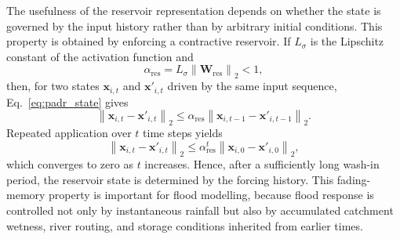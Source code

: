 \documentclass[pdflatex,sn-mathphys-ay]{sn-jnl}
\theoremstyle{thmstyleone}
\theoremstyle{thmstylethree}
\theoremstyle{thmstyletwo}
\begin{document}
The usefulness of the reservoir representation depends on whether the
state is governed by the input history rather than by arbitrary initial
conditions.  This property is obtained by enforcing a contractive
reservoir.  If $L_{\sigma}$ is the Lipschitz constant of the activation
function and
\begin{equation}
  \alpha_{\mathrm{res}}
  =
  L_{\sigma}
  \left\|
    \mathbf{W}_{\mathrm{res}}
  \right\|_{2}
  <1,
  \label{eq:reservoir_contractivity_condition}
\end{equation}
then, for two states $\mathbf{x}_{i,t}$ and $\mathbf{x}'_{i,t}$ driven
by the same input sequence, Eq.~\eqref{eq:padr_state} gives
\begin{equation}
  \left\|
    \mathbf{x}_{i,t}
    -
    \mathbf{x}'_{i,t}
  \right\|_{2}
  \leq
  \alpha_{\mathrm{res}}
  \left\|
    \mathbf{x}_{i,t-1}
    -
    \mathbf{x}'_{i,t-1}
  \right\|_{2}.
  \label{eq:reservoir_one_step}
\end{equation}
Repeated application over $t$ time steps yields
\begin{equation}
  \left\|
    \mathbf{x}_{i,t}
    -
    \mathbf{x}'_{i,t}
  \right\|_{2}
  \leq
  \alpha_{\mathrm{res}}^{t}
  \left\|
    \mathbf{x}_{i,0}
    -
    \mathbf{x}'_{i,0}
  \right\|_{2},
  \label{eq:reservoir_fading_memory}
\end{equation}
which converges to zero as $t$ increases.  Hence, after a sufficiently
long wash-in period, the reservoir state is determined by the forcing
history.  This fading-memory property is important for flood modelling,
because flood response is controlled not only by instantaneous rainfall
but also by accumulated catchment wetness, river routing, and storage
conditions inherited from earlier times.
\end{document}
